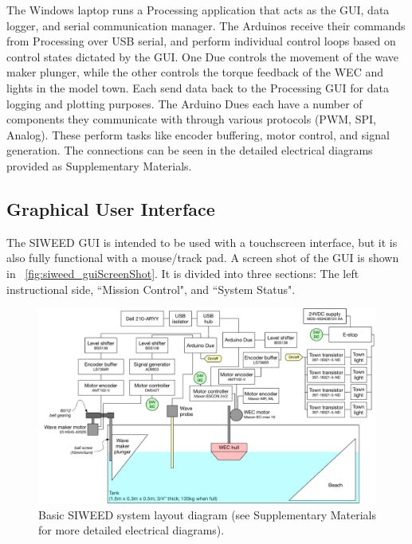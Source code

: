\documentclass[hardware,article,submit,pdftex,moreauthors]{Definitions/mdpi}
\begin{document}
The Windows laptop runs a Processing application that acts as the GUI, data logger, and serial communication manager.
The Arduinos receive their commands from Processing over USB serial, and perform individual control loops based on control states dictated by the GUI.
One Due controls the movement of the wave maker plunger, while the other controls the torque feedback of the WEC and lights in the model town.
Each send data back to the Processing GUI for data logging and plotting purposes.
The Arduino Dues each have a number of components they communicate with through various protocols (PWM, SPI, Analog).
These perform tasks like encoder buffering, motor control, and signal generation.
The connections can be seen in the detailed electrical diagrams provided as Supplementary Materials.

\subsection{Graphical User Interface}
The SIWEED GUI is intended to be used with a touchscreen interface, but it is also fully functional with a mouse/track pad.
A screen shot of the GUI is shown in \figurename~\ref{fig:siweed_guiScreenShot}.
It is divided into three sections: The left instructional side, ``Mission Control", and ``System Status".

\begin{figure}[tb]
  \centering
  \includegraphics[width=1\textwidth]{diagrams/siweed_cartoon.pdf}
  \caption{Basic SIWEED system layout diagram (see Supplementary Materials for more detailed electrical diagrams).}
  \label{fig:siweed_layout}
\end{figure}
\end{document}
